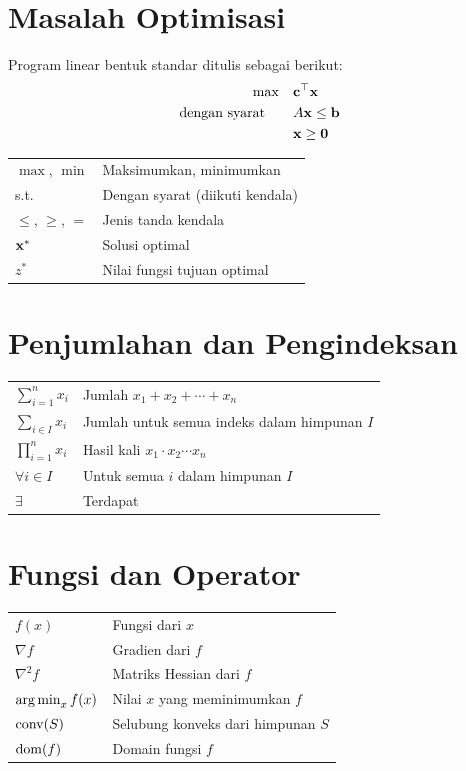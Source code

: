 \section*{Masalah Optimisasi}

Program linear bentuk standar ditulis sebagai berikut:
\[
\begin{split}
\max \quad & \mathbf{c}^\top \mathbf{x} \\
\mbox{dengan syarat}\quad \quad & A\mathbf{x} \leq \mathbf{b} \\
& \mathbf{x} \geq \mathbf{0}
\end{split}
\]

\begin{tabular}{@{}ll@{}}
$\max$, $\min$ & Maksimumkan, minimumkan \\
s.t. & Dengan syarat (diikuti kendala) \\
$\leq$, $\geq$, $=$ & Jenis tanda kendala \\
$\mathbf{x}^*$ & Solusi optimal \\
$z^*$ & Nilai fungsi tujuan optimal \\
\end{tabular}

\section*{Penjumlahan dan Pengindeksan}

\begin{tabular}{@{}ll@{}}
$\sum_{i=1}^{n} x_i$ & Jumlah $x_1 + x_2 + \cdots + x_n$ \\
$\sum_{i \in I} x_i$ & Jumlah untuk semua indeks dalam himpunan $I$ \\
$\prod_{i=1}^{n} x_i$ & Hasil kali $x_1 \cdot x_2 \cdots x_n$ \\
$\forall i \in I$ & Untuk semua $i$ dalam himpunan $I$ \\
$\exists$ & Terdapat \\
\end{tabular}

\section*{Fungsi dan Operator}

\begin{tabular}{@{}ll@{}}
$f(x)$ & Fungsi dari $x$ \\
$\nabla f$ & Gradien dari $f$ \\
$\nabla^2 f$ & Matriks Hessian dari $f$ \\
$\operatorname*{arg\,min}_x f(x)$ & Nilai $x$ yang meminimumkan $f$ \\
$\textup{conv}(S)$ & Selubung konveks dari himpunan $S$ \\
$\operatorname{dom}(f)$ & Domain fungsi $f$ \\
\end{tabular}

